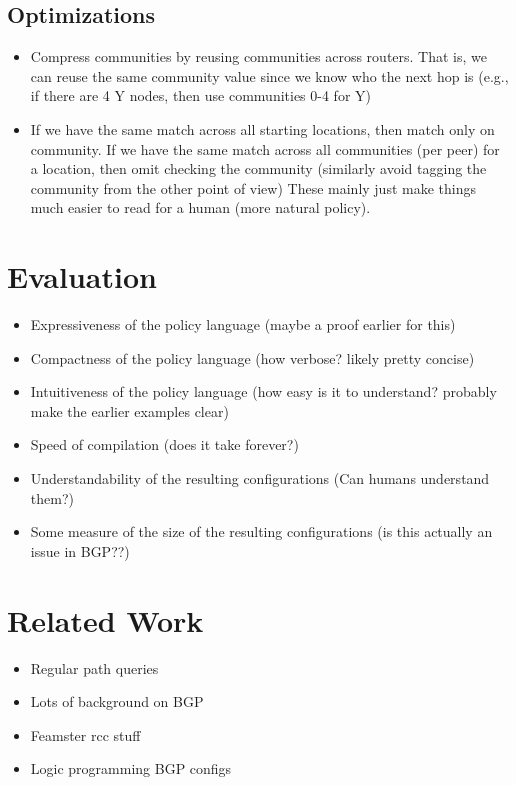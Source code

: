 \documentclass{sigplanconf}
\begin{document}
\subsection{Optimizations}

\begin{itemize}
	\item Compress communities by reusing communities across routers.
	      That is, we can reuse the same community value since we know who the next hop is 
	      (e.g., if there are 4 Y nodes, then use communities 0-4 for Y)

	\item If we have the same match across all starting locations, then match only on community.
		  If we have the same match across all communities (per peer) for a location, then omit checking 
		  the community (similarly avoid tagging the community from the other point of view)
		  These mainly just make things much easier to read for a human (more natural policy).
\end{itemize}



\section{Evaluation}

\begin{itemize}
	\item Expressiveness of the policy language (maybe a proof earlier for this)
	\item Compactness of the policy language (how verbose? likely pretty concise)
	\item Intuitiveness of the policy language (how easy is it to understand? probably make the earlier examples clear)
	\item Speed of compilation (does it take forever?)
	\item Understandability of the resulting configurations (Can humans understand them?)
	\item Some measure of the size of the resulting configurations (is this actually an issue in BGP??)
\end{itemize}

\section{Related Work}

\begin{itemize}
	\item Regular path queries
	\item Lots of background on BGP
	\item Feamster rcc stuff
	\item Logic programming BGP configs
\end{itemize}
\end{document}
